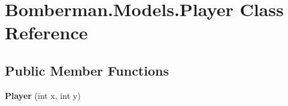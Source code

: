 \hypertarget{class_bomberman_1_1_models_1_1_player}{}\section{Bomberman.\+Models.\+Player Class Reference}
\label{class_bomberman_1_1_models_1_1_player}
\subsection*{Public Member Functions}
\begin{DoxyCompactItemize}
\item 
\mbox{\label{class_bomberman_1_1_models_1_1_player_a61d863ce4a7829ef525f4910317b2f13}} 
{\bfseries Player} (int x, int y)
\end{DoxyCompactItemize}
